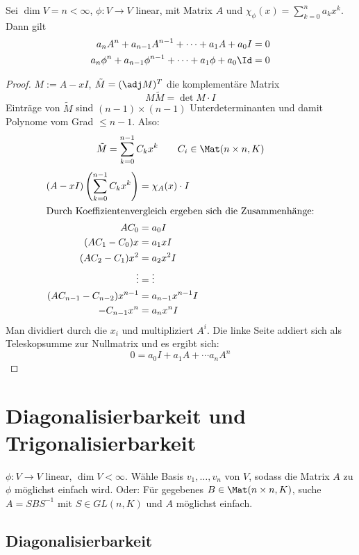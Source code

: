 \documentclass{mycourse}
\begin{document}
\begin{thm}
\label{thm:10.17}
Sei $\dim V=n<\infty$, $\phi:V\to V$ linear, mit Matrix $A$ und $\chi_\phi(x)=\sum_{k=0}^na_kx^k$.
Dann gilt
\begin{align*}
a_nA^n+a_{n-1}A^{n-1}+\dotsb+a_1A+a_0I&=0\\
a_n\phi^n+a_{n-1}\phi^{n-1}+\dotsb+a_1\phi+a_0\Id&=0
\end{align*}

\begin{proof}
$M:=A-xI$, $\tilde M = (\adj M)^T$ die komplementäre Matrix
\[
M\tilde M = \det M \cdot I
\]
Einträge von $\tilde M$ sind $(n-1)\times(n-1)$ Unterdeterminanten und damit Polynome vom Grad $\le n-1$.
Also:
\begin{align*}
\tilde M = \sum_{k=0}^{n-1}C_{k}x^{k} \qquad C_i\in \Mat(n\times n, K)
\end{align*}
\begin{align*}
(A-xI)\left(\sum_{k=0}^{n-1}C_k x^k\right) &= \chi_A(x)\cdot I\\
	\intertext{Durch Koeffizientenvergleich ergeben sich die Zusammenhänge:}
								A C_0 &= a_0 I\\
(AC_1-C_0)x &= a_1xI\\
(AC_2-C_1)x^2 &= a_2x^2I\\
\vdots &= \vdots\\
(AC_{n-1}-C_{n-2})x^{n-1} &= a_{n-1}x^{n-1}I\\
-C_{n-1}x^n &= a_nx^nI
\end{align*}
Man dividiert durch die $x_i$ und multipliziert $A^i$.
Die linke Seite addiert sich als Teleskopsumme zur Nullmatrix und es ergibt sich:
\[
0 = a_0I + a_1A+\dotsb a_nA^n
\]
\end{proof}
\end{thm}


\chapter{Diagonalisierbarkeit und Trigonalisierbarkeit}



$\phi: V\to V$ linear, $\dim V < \infty$.
Wähle Basis $v_1,\dotsc, v_n$ von $V$, sodass die Matrix $A$ zu $\phi$ möglichst einfach wird.
Oder: Für gegebenes $B\in \Mat(n\times n, K)$, suche $A=SBS^{-1}$ mit $S\in GL(n,K)$ und $A$ möglichst einfach.

\section{Diagonalisierbarkeit}
\end{document}
